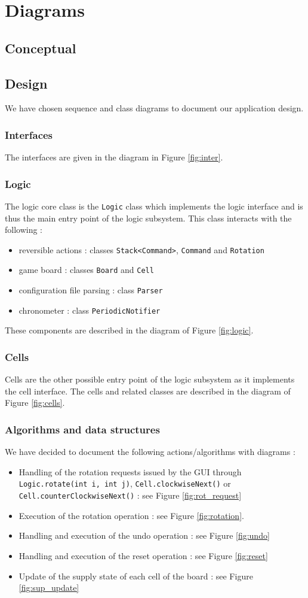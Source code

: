 \documentclass[a4paper,11pt]{article}
\begin{document}
\section{Diagrams}
\label{sec:diagrams}
\subsection{Conceptual}
\subsection{Design}
We have chosen sequence and class diagrams to document our application design. 
\subsubsection{Interfaces}
The interfaces are given in the diagram in Figure \ref{fig:inter}.
\subsubsection{Logic}
The logic core class is the \texttt{Logic} class which implements the logic interface and is thus the main entry point of the logic subsystem. This class interacts with the following :
\begin{itemize}
	\item reversible actions : classes \texttt{Stack<Command>}, \texttt{Command} and \texttt{Rotation} 
	\item game board : classes \texttt{Board} and \texttt{Cell}
	\item configuration file parsing : class \texttt{Parser}
	\item chronometer : class \texttt{PeriodicNotifier}
\end{itemize}
These components are described in the diagram of Figure \ref{fig:logic}.
\subsubsection{Cells}
Cells are the other possible entry point of the logic subsystem as it implements the cell interface. The cells and related classes are described in the diagram of Figure \ref{fig:cells}.
\subsubsection{Algorithms and data structures}
We have decided to document the following actions/algorithms with diagrams :
\begin{itemize}
	\item Handling of the rotation requests issued by the GUI through \texttt{Logic.rotate(int i, int j)}, \texttt{Cell.clockwiseNext()} or \texttt{Cell.counterClockwiseNext()} : see Figure \ref{fig:rot_request}
	\item Execution of the rotation operation : see Figure \ref{fig:rotation}.
	\item Handling and execution of the undo operation  : see Figure \ref{fig:undo}
	\item Handling and execution of the reset operation : see Figure \ref{fig:reset}
	\item Update of the supply state of each cell of the board : see Figure \ref{fig:sup_update}
\end{itemize}
\end{document}
